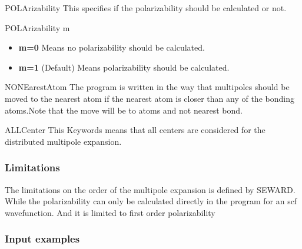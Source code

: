 \begin{keywordlist}
\item[POLArizability]
This specifies if the polarizability should be calculated or not.
\begin{inputlisting}
POLArizability
m
\end{inputlisting}

\begin{itemize}
\itemsep 9pt plus 3pt minus 3pt
\item
{\bf m=0}
Means no polarizability should be calculated.
\item
{\bf m=1}
(Default) Means polarizability should be calculated.
\end{itemize}

\item[NONEarestAtom]
The program is written in the way that multipoles should be moved
to the nearest atom if the nearest atom is closer than any of the
bonding atoms.Note that the move will be to atoms and not nearest bond.

\item[ALLCenter]
This Keywords means that all centers are considered for the distributed multipole expansion.

\end{keywordlist}

\subsubsection{Limitations}
The limitations on the order of the multipole expansion is defined by {\prgmfont SEWARD}.
While the polarizability can only be calculated directly in the program for an scf wavefunction.
And it is limited to first order polarizability

\subsubsection{Input examples}

